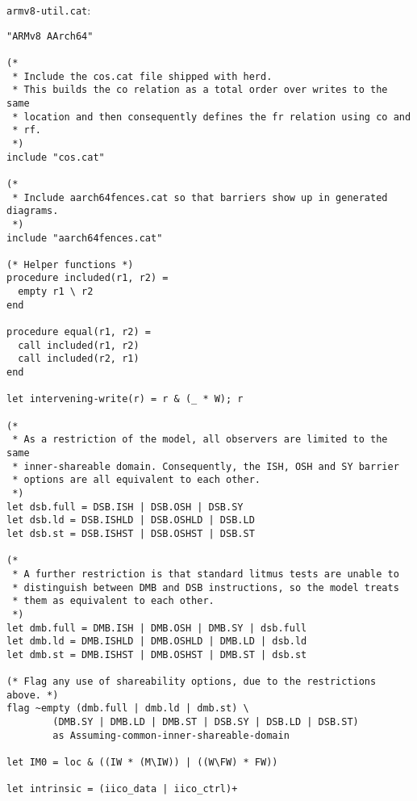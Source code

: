 \texttt{armv8-util.cat}:
\begin{verbatim}
"ARMv8 AArch64"

(*
 * Include the cos.cat file shipped with herd.
 * This builds the co relation as a total order over writes to the same
 * location and then consequently defines the fr relation using co and
 * rf.
 *)
include "cos.cat"

(*
 * Include aarch64fences.cat so that barriers show up in generated diagrams.
 *)
include "aarch64fences.cat"

(* Helper functions *)
procedure included(r1, r2) =
  empty r1 \ r2
end

procedure equal(r1, r2) =
  call included(r1, r2)
  call included(r2, r1)
end

let intervening-write(r) = r & (_ * W); r

(*
 * As a restriction of the model, all observers are limited to the same
 * inner-shareable domain. Consequently, the ISH, OSH and SY barrier
 * options are all equivalent to each other.
 *)
let dsb.full = DSB.ISH | DSB.OSH | DSB.SY
let dsb.ld = DSB.ISHLD | DSB.OSHLD | DSB.LD
let dsb.st = DSB.ISHST | DSB.OSHST | DSB.ST

(*
 * A further restriction is that standard litmus tests are unable to
 * distinguish between DMB and DSB instructions, so the model treats
 * them as equivalent to each other.
 *)
let dmb.full = DMB.ISH | DMB.OSH | DMB.SY | dsb.full
let dmb.ld = DMB.ISHLD | DMB.OSHLD | DMB.LD | dsb.ld
let dmb.st = DMB.ISHST | DMB.OSHST | DMB.ST | dsb.st

(* Flag any use of shareability options, due to the restrictions above. *)
flag ~empty (dmb.full | dmb.ld | dmb.st) \
	    (DMB.SY | DMB.LD | DMB.ST | DSB.SY | DSB.LD | DSB.ST)
	    as Assuming-common-inner-shareable-domain

let IM0 = loc & ((IW * (M\IW)) | ((W\FW) * FW))

let intrinsic = (iico_data | iico_ctrl)+
\end{verbatim}


